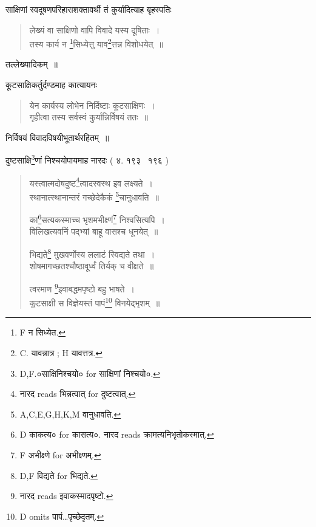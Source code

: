 \documentclass[11pt, openany]{book}
\begin{document}
साक्षिणां स्वदूषणपरिहाराशक्तावर्थी तं कुर्यादित्याह बृहस्पतिः

\begin{quote}
{\vy लेख्यं वा साक्षिणो वापि विवादे यस्य दूषिताः~।\\
तस्य कार्य न \renewcommand{\thefootnote}{7}\footnote{F न सिध्येत.}सिध्येत्तु याव\renewcommand{\thefootnote}{8}\footnote{C. यावन्नात्र ; H यावत्तत्र.}त्तन्न विशोधयेत्~॥}
\end{quote}

\noindent
तल्लेख्यादिकम्~॥

कूटसाक्षिकर्तुर्दण्डमाह कात्यायनः

\newpage
{}

\begin{quote}
{\vy येन कार्यस्य लोभेन निर्दिष्टाः कूटसाक्षिणः~।\\
गृहीत्वा तस्य सर्वस्वं कुर्यान्निर्विषयं ततः~॥}
\end{quote}

\noindent
निर्विषयं विवादविषयीभूतार्थरहितम्~॥ 

दुष्टसाक्षि\renewcommand{\thefootnote}{1}\footnote{D,F.०साक्षिनिश्चयो० for साक्षिणां निश्चयो०.}णां निश्चयोपायमाह नारदः ( ४. १९३ \textendash\ १९६ )

\begin{quote}
{\vy यस्त्वात्मदोषदुष्ट\renewcommand{\thefootnote}{2}\footnote{नारद reads भिन्नत्वात् for दुष्टत्वात्.}त्वादस्वस्थ इव लक्ष्यते~।\\
स्थानात्स्थानान्तरं गच्छेदेकैकं \renewcommand{\thefootnote}{3}\footnote{A,C,E,G,H,K,M वानुधावति.}चानुधावति~॥

का\renewcommand{\thefootnote}{4}\footnote{D काकत्य० for कासत्य०. नारद reads क्रामत्यनिभृतोकस्मात्.}सत्यकस्माच्च भृशमभीक्ष्णं\renewcommand{\thefootnote}{5}\footnote{F अभीक्ष्णे for अभीक्ष्णम्.} निश्वसित्यपि~।\\
विलिखत्यवनिं पद्भ्यां बाहू वासश्च धूनयेत्~॥

भिद्यते\renewcommand{\thefootnote}{6}\footnote{D,F विद्यते for भिद्यते.} मुखवर्णोस्य ललाटं स्विद्यते तथा~।\\
शोषमागच्छतश्चौष्ठावूर्ध्वं तिर्यक् च वीक्षते~॥

त्वरमाण \renewcommand{\thefootnote}{7}\footnote{नारद reads इवाकस्मादपृष्टो.}इवाबद्धमपृष्टो बहु भाषते~।\\
कूटसाक्षी स विज्ञेयस्तं पापं\renewcommand{\thefootnote}{8}\footnote{D omits पापं\ldots पृच्छेदृतम्.} विनयेद्भृशम्~॥}
\end{quote}
\end{document}
